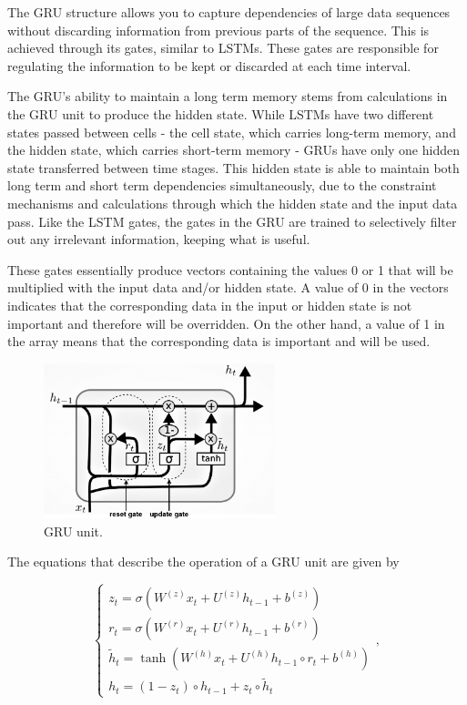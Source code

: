 The \ac{GRU} structure allows you to capture dependencies of large data sequences without discarding information from previous parts of the sequence. This is achieved through its gates, similar to \ac{LSTM}s. These gates are responsible for regulating the information to be kept or discarded at each time interval.

The \ac{GRU}'s ability to maintain a long term memory stems from calculations in the \ac{GRU} unit to produce the hidden state. While \ac{LSTM}s have two different states passed between cells - the cell state, which carries long-term memory, and the hidden state, which carries short-term memory - \ac{GRU}s have only one hidden state transferred between time stages. This hidden state is able to maintain both long term and short term dependencies simultaneously, due to the constraint mechanisms and calculations through which the hidden state and the input data pass.  Like the \ac{LSTM} gates, the gates in the \ac{GRU} are trained to selectively filter out any irrelevant information, keeping what is useful.

These gates essentially produce vectors containing the values 0 or 1 that will be multiplied with the input data and/or hidden state. A value of 0 in the vectors indicates that the corresponding data in the input or hidden state is not important and therefore will be overridden. On the other hand, a value of 1 in the array means that the corresponding data is important and will be used.


\begin{figure}[h!]
    \centering
    \begin{center}
    \includegraphics[width=0.6\textwidth]{Images/GRU_cell_detailed.png}
    \caption{GRU unit.}
    \label{gru}
    \end{center}
\end{figure}

The equations that describe the operation of a \ac{GRU} unit are given by 

\begin{equation}
    \begin{cases} 
        
        z_t = \sigma(W^{(z)} x_t + U^{(z)} h_{t-1} + b^{(z)})\\
        r_t = \sigma(W^{(r)} x_t + U^{(r)} h_{t-1} + b^{(r)})\\
        \tilde{h}_t = \tanh(W^{(h)} x_t + U^{(h)} h_{t-1} \circ r_t + b^{(h)})\\
        h_t = (1-z_t) \circ h_{t-1} + z_t \circ \tilde{h}_t

    \end{cases} ,
\end{equation}

